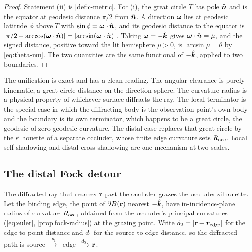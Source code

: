 \begin{proof}
Statement (ii) is \cref{def:c-metric}. For (i), the great circle $T$ has pole
$\hat{\bm{n}}$ and is the equator at geodesic distance $\pi/2$ from $\hat{\bm{n}}$. A direction
$\bm{\omega}$ lies at geodesic latitude $\phi$ above $T$ with
$\sin\phi=\bm{\omega}\cdot\hat{\bm{n}}$, and its geodesic distance to the equator is
$\abs{\pi/2-\arccos(\bm{\omega}\cdot\hat{\bm{n}})}=\abs{\arcsin(\bm{\omega}\cdot\hat{\bm{n}})}$.
Taking $\bm{\omega}=-\hat{\bm{k}}$ gives $\bm{\omega}\cdot\hat{\bm{n}}=\mu$, and the signed
distance, positive toward the lit hemisphere $\mu>0$, is $\arcsin\mu=\theta$ by
\cref{eq:theta-mu}. The two quantities are the same functional of $-\hat{\bm{k}}$, applied
to two boundaries.
\end{proof}

The unification is exact and has a clean reading. The angular clearance is purely
kinematic, a great-circle distance on the direction sphere. The curvature radius
is a physical property of whichever surface diffracts the ray. The local
terminator is the special case in which the diffracting body is the observation
point's own body and the boundary is its own terminator, which happens to be a
great circle, the geodesic of zero geodesic curvature. The distal case replaces
that great circle by the silhouette of a separate occluder, whose finite edge
curvature sets $R_{\mathrm{occ}}$. Local self-shadowing and distal cross-shadowing are one
mechanism at two scales.

\subsection{The distal Fock detour}\label{sec:cmetric-detour}

The diffracted ray that reaches $\mathbf{r}$ past the occluder grazes the occluder
silhouette. Let the binding edge, the point of $\partial B(\mathbf{r})$ nearest $-\hat{\bm{k}}$,
have in-incidence-plane radius of curvature $R_{\mathrm{occ}}$, obtained from the occluder's
principal curvatures (\cref{eq:euler}, \cref{prop:fock-radius}) at the grazing
point. Write $d_2=\abs{\mathbf{r}-\bm{r}_{\mathrm{edge}}}$ for the edge-to-point distance
and $d_1$ for the source-to-edge distance, so the diffracted path is source
$\,\xrightarrow{d_1}\,$ edge $\,\xrightarrow{d_2}\,\mathbf{r}$.


